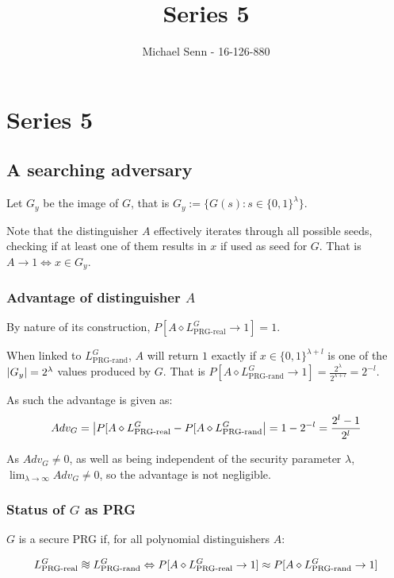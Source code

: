\documentclass[a4paper]{scrreprt}
\title{Series 5}
\author{Michael Senn \maillink{michael.senn@students.unibe.ch} - 16-126-880}
\date{\printdate}
\DeclarePairedDelimiter\abs{\lvert}{\rvert}
\newcommand*{\diffeo}{%
  \mathrel{\vcenter{\offinterlineskip
  \hbox{$\sim$}\vskip-.35ex\hbox{$\sim$}\vskip-.35ex\hbox{$\sim$}}}}
\begin{document}
\maketitle


\setcounter{chapter}{4}
\chapter{Series 5}

\section{A searching adversary}

Let $G_y$ be the image of $G$, that is $G_y := \{G(s) : s \in \{0,
1\}^\lambda\}$.

Note that the distinguisher $A$ effectively iterates through all possible
seeds, checking if at least one of them results in $x$ if used as seed for $G$.
That is $A \rightarrow 1 \Leftrightarrow x \in G_y$.

\subsection{Advantage of distinguisher $A$}

By nature of its construction, $P[A \diamond L^G_{\text{PRG-real}} \rightarrow
1] = 1$.

When linked to $L^G_{\text{PRG-rand}}$, $A$ will return $1$ exactly if $x \in
\{0, 1\}^{\lambda + l}$ is one of the $\abs{G_y} = 2^\lambda$ values produced
by $G$. That is $P[A \diamond L^G_{\text{PRG-rand}} \rightarrow 1] =
\frac{2^\lambda}{2^{\lambda + l}} = 2^{-l}$.

As such the advantage is given as:
\[
	Adv_G = \abs*{P[A \diamond L^G_{\text{PRG-real}} - P[A \diamond L^G_{\text{PRG-rand}}} = 1 - 2^{-l} = \frac{2^l - 1}{2^l}
\]

As $Adv_G \neq 0$, as well as being independent of the security parameter
$\lambda$, $\lim_{\lambda \rightarrow \infty}{Adv_G} \neq 0$, so the advantage
is not negligible.

\subsection{Status of $G$ as PRG}

$G$ is a secure PRG if, for all polynomial distinguishers $A$:

\[
	L^G_{\text{PRG-real}} \diffeo L^G_{\text{PRG-rand}} \Leftrightarrow P[A \diamond L^G_{\text{PRG-real}} \rightarrow 1] \approx P[A \diamond L^G_{\text{PRG-rand}} \rightarrow 1]
\]
\end{document}
